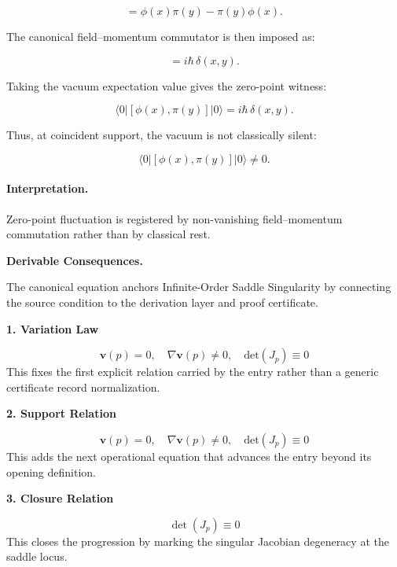 \begin{equation}
[\phi(x),\pi(y)]
=
\phi(x)\pi(y)-\pi(y)\phi(x).
\end{equation}

The canonical field--momentum commutator is then imposed as:

\begin{equation}
[\phi(x),\pi(y)] = i\hbar\,\delta(x,y).
\end{equation}

Taking the vacuum expectation value gives the zero-point witness:

\begin{equation}
\langle 0|[\phi(x),\pi(y)]|0\rangle
=
i\hbar\,\delta(x,y).
\end{equation}

Thus, at coincident support, the vacuum is not classically silent:

\begin{equation}
\boxed{
\langle 0|[\phi(x),\pi(y)]|0\rangle \neq 0 .
}
\end{equation}

\paragraph{Interpretation.}
Zero-point fluctuation is registered by non-vanishing field--momentum commutation rather than by classical rest.

\par\vspace{0.35em}
\noindent\textbf{Derivable Consequences.}\quad
\begingroup
\footnotesize
\raggedright
The canonical equation anchors Infinite-Order Saddle Singularity by connecting the source condition to the derivation layer and proof certificate.
\par\endgroup

\noindent\textbf{1. Variation Law}\par
\[
\mathbf{v}(p) = 0, \quad \nabla \mathbf{v}(p) \neq 0, \quad \text{det}(J_p) \equiv 0
\]
\noindent This fixes the first explicit relation carried by the entry rather than a generic certificate record normalization.\par
\noindent\textbf{2. Support Relation}\par
\[
\mathbf{v}(p) = 0, \quad \nabla \mathbf{v}(p) \neq 0, \quad \text{det}(J_p) \equiv 0
\]
\noindent This adds the next operational equation that advances the entry beyond its opening definition.\par
\noindent\textbf{3. Closure Relation}\par
\[
\det(J_p)\equiv0
\]
\noindent This closes the progression by marking the singular Jacobian degeneracy at the saddle locus.\par


